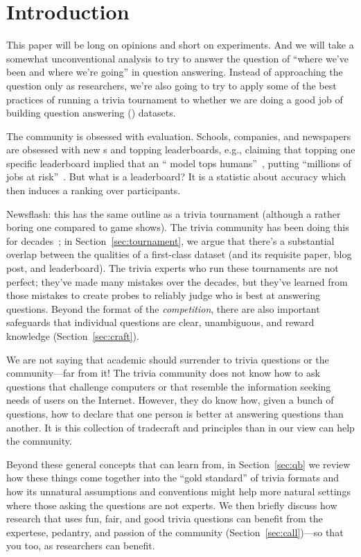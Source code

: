 

\section{Introduction}


This paper will be long on opinions and short on experiments.
And we will take a somewhat unconventional analysis to try to answer the question of ``where we've been and where we're going'' in question answering.
Instead of approaching the question only as  researchers, we're also going to try to apply some of the best practices of running a trivia tournament to whether we are doing a good job of building question answering () datasets.

The \qa{} community is obsessed with evaluation.
Schools, companies, and newspapers are obsessed with new s and
topping leaderboards, e.g., claiming that topping one specific leaderboard implied that an `` model tops humans''~\citep{najberg-18}, putting ``millions of jobs at risk''~\cite{cuthbertson-18}.
But what is a leaderboard? 
It is a statistic about \qa{} accuracy which then induces a ranking over participants.

Newsflash: this has the same outline as a trivia tournament (although a rather boring one compared to game shows).  
The trivia community has been doing this for decades~\cite{jennings-06}; in
Section~\ref{sec:tournament}, we argue that there's a substantial
overlap between the qualities of a first-class  dataset (and
its requisite paper, blog post, and leaderboard).
The trivia experts who run these tournaments are not perfect; they've
made many mistakes over the decades, but they've learned from those
mistakes to create probes to reliably judge who is best at answering
questions.
Beyond the format of the \emph{competition}, there are also important
safeguards that individual questions are clear, unambiguous,
and reward knowledge (Section~\ref{sec:craft}).

We are not saying that academic  should surrender to trivia questions or the community---far from it!
The trivia community does not know how to ask questions that challenge computers or that resemble the information seeking needs of users on the Internet.
However, they do know how, given a bunch of questions, how to declare that one person is better at answering questions than another.
It is this collection of tradecraft and principles than in our view can help the  community.

Beyond these general concepts that  can learn from, in
Section~\ref{sec:qb} we review how these things come together into the ``gold standard'' of trivia formats and how its unnatural assumptions and conventions might help more natural  settings where those asking the questions are not experts.
We then briefly discuss how research that uses fun, fair, and good
trivia questions can benefit from the expertese, pedantry, and passion
of the community (Section~\ref{sec:call})---so that you too, as
researchers can benefit.